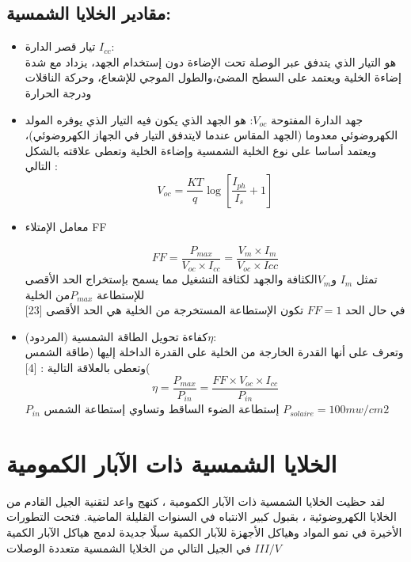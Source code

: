 	\subsection{  مقادير الخلايا الشمسية:  } 
	\begin{itemize}
		\item تيار قصر الدارة $ I_{cc} $:
		\\
		هو التيار الذي يتدفق عبر الوصلة تحت الإضاءة دون إستخدام الجهد، يزداد مع شدة إضاءة الخلية ويعتمد على السطح المضئ،والطول الموجي للإشعاع، وحركة الناقلات ودرجة الحرارة
		\item جهد الدارة المفتوحة  $ V_{oc} $:
		هو الجهد الذي يكون فيه التيار الذي يوفره المولد الكهروضوئي معدوما (الجهد المقاس عندما لايتدفق التيار في الجهاز الكهروضوئي)، ويعتمد أساسا على نوع الخلية الشمسية وإضاءة الخلية وتعطى علاقته بالشكل التالي :
		\begin {equation} 
		V_{oc}=\frac{KT}{q}\log [\frac{I_{ph}}{I_s} +1]
		\end {equation}
		\item معامل الإمتلاء FF
		
		\begin {equation} 
		\label{FF_eq}
		FF=\frac{P_{max}}{V_ {oc} ×I_ {cc }}
		=\frac{ V_m×I_m}{ V_{oc} ×I{cc}}
		\end {equation}
		تمثل  $  I_m $ و$ V_m  $الكثافة والجهد لكثافة التشغيل مما يسمح بإستخراج الحد الأقصى للإستطاعة  $ P_{max}  $من الخلية \\
		في حال الحد $  FF=1 $ تكون الإستطاعة المستخرجة من الخلية هي الحد الأقصى 
		[23]
		\item  كفاءة تحويل الطاقة الشمسية (المردود)$\eta$:      \\
		وتعرف على أنها القدرة الخارجة من الخلية على القدرة الداخلة إليها (طاقة الشمس )وتعطى بالعلاقة التالية :
		[4]
		\begin {equation} 
		\label{n_eq}
		\eta= \frac{ P_{max}}{P_{in}}
		=\frac{ FF×V_{oc}× I_{cc}}{ P_{in}}
		\end {equation}
		$ P_{in} $				           
		إستطاعة الضوء الساقط وتساوي إستطاعة الشمس $ P_{solaire}=100 mw/cm2 $		  
	\end{itemize}
	
	\section { الخلايا الشمسية ذات الآبار الكمومية  }
	لقد حظيت الخلايا الشمسية ذات الآبار الكمومية ، كنهج واعد لتقنية الجيل القادم من الخلايا الكهروضوئية ، بقبول كبير الانتباه في السنوات القليلة الماضية. فتحت التطورات الأخيرة في نمو المواد وهياكل الأجهزة للآبار الكمية سبلًا جديدة لدمج هياكل الآبار الكمية في الجيل التالي من الخلايا الشمسية متعددة الوصلات $ III / V $
